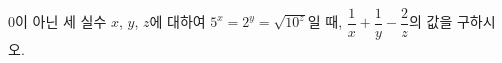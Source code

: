 $0$이 아닌 세 실수 $x$, $y$, $z$에 대하여 $5^x=2^y=\sqrt{10^z}$일 때, $\dfrac{1}{x}+\dfrac{1}{y}-\dfrac{2}{z}$의 값을 구하시오.
